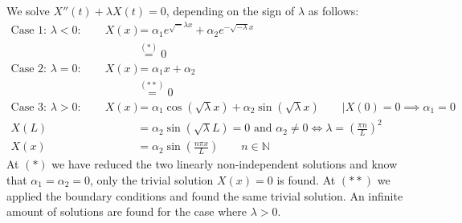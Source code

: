 We solve $X''(t)+\lambda X(t) = 0$, depending on the sign of $\lambda$ as follows:
\begin{equation*}
	\begin{split}
		\text{Case 1: $\lambda < 0$}: \qquad 
		X(x) & = \alpha_1 e^{{\sqrt-\lambda}x}+ \alpha_2 e^{-\sqrt{-\lambda}x}\\
		 	 & \stackrel{(*)}{=} 0\\
		\text{Case 2: $\lambda = 0$}: \qquad X(x) &= \alpha_1 x + \alpha_2\\
		 	 & \stackrel{(**)}{=} 0\\
		\text{Case 3: $\lambda > 0$}: \qquad X(x) &= \alpha_1 \cos(\sqrt \lambda x) + \alpha_2 \sin(\sqrt \lambda x) \qquad \left | X(0) = 0 \implies \alpha_1 = 0\right .\\
		X(L)&= \alpha_2 \sin(\sqrt \lambda L) = 0\text{ and }\alpha_2 \ne 0\Leftrightarrow \lambda = \left(\frac{\pi n}{L}\right)^2\\
		X(x) &= \alpha_2 \sin\left(\frac{n\pi x}{L}\right)\qquad n \in \mathbb N
	\end{split}
\end{equation*}
At $(*)$ we have reduced the two linearly non-independent solutions and know that $\alpha_1=\alpha_2= 0$, only the trivial solution $X(x)=0$ is found. At $(**)$ we applied the boundary conditions and found the same trivial solution.
An infinite amount of solutions are found for the case where $\lambda > 0$.


